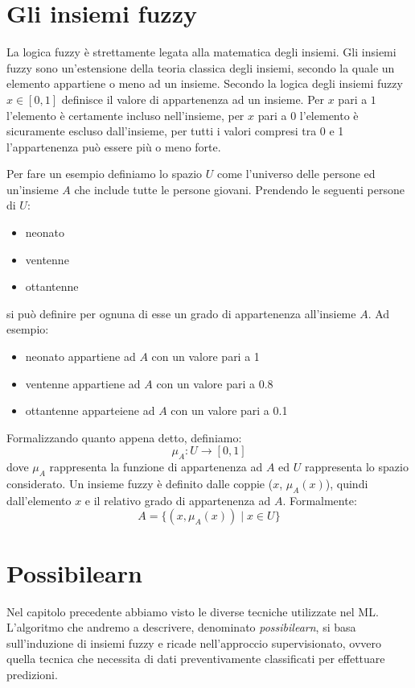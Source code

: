 \documentclass[12pt,italian]{report}
\begin{document}
\section{Gli insiemi fuzzy}
La logica fuzzy è strettamente legata alla matematica degli insiemi. Gli insiemi fuzzy sono un'estensione della teoria classica degli insiemi, secondo la quale un elemento appartiene o meno ad un insieme. %
Secondo la logica degli insiemi fuzzy $x \in [0,1]$ definisce il valore di appartenenza ad un insieme. Per $ x $ pari a $ 1 $ l'elemento è certamente incluso nell'insieme, per $ x $ pari a $ 0 $ l'elemento è sicuramente escluso dall'insieme, per tutti i valori compresi tra 0 e 1 l'appartenenza può essere più o meno forte.

Per fare un esempio definiamo lo spazio $ U $ come l'universo delle persone ed un'insieme $ A $ che include tutte le persone giovani.
Prendendo le seguenti persone di $ U $:
\begin{itemize}
	\item neonato
	\item ventenne
	\item ottantenne
\end{itemize}
si può definire per ognuna di esse un grado di appartenenza all'insieme $ A $. Ad esempio:
\begin{itemize}
	\item neonato appartiene ad $ A $ con un valore pari a 1
	\item ventenne appartiene ad $ A $ con un valore pari a 0.8
	\item ottantenne apparteiene ad $ A $ con un valore pari a 0.1
\end{itemize}
Formalizzando quanto appena detto, definiamo:
\[ \mu_{A}: U \rightarrow [0,1] \]
dove $ \mu_{A} $ rappresenta la funzione di appartenenza ad $ A $ ed $ U $ rappresenta lo spazio considerato. Un insieme fuzzy è definito dalle coppie ($x$,  $ \mu_{A}(x)$), quindi dall'elemento $ x $ e il relativo grado di appartenenza ad $ A $. Formalmente:
\[ A = \{  (x, \mu_{A}(x)) \mid x \in U\} \]

\section{Possibilearn}

Nel capitolo precedente abbiamo visto le diverse tecniche utilizzate nel ML. L'algoritmo che andremo a descrivere, denominato \emph{possibilearn}, si basa sull'induzione di insiemi fuzzy e ricade nell'approccio supervisionato, ovvero quella tecnica che necessita di dati preventivamente classificati per effettuare predizioni.
\end{document}
